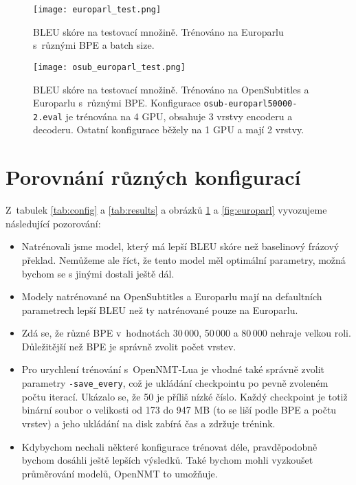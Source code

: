 \documentclass[a4]{article}
\begin{document}
\begin{figure}[p]
\centering
  \texttt{[image: europarl\_test.png]}
    \caption{BLEU skóre na testovací množině. Trénováno na Europarlu
	s~různými BPE a batch size.}
  \label{fig:europarl}
  \texttt{[image: osub\_europarl\_test.png]}
    \caption{BLEU skóre na testovací množině. Trénováno na OpenSubtitles a Europarlu
	s~různými BPE. Konfigurace \texttt{osub-europarl50000-2.eval} je trénována
	na 4 GPU, obsahuje 3 vrstvy encoderu a decoderu. Ostatní konfigurace běžely
	na 1 GPU a mají 2 vrstvy.}
  \label{fig:osub}
\end{figure}



\section{Porovnání různých konfigurací}

Z~tabulek \ref{tab:config} a \ref{tab:results} a obrázků 
\ref{fig:osub} a \ref{fig:europarl} vyvozujeme následující pozorování:

\begin{itemize}

\item Natrénovali jsme model, který má lepší BLEU skóre než baselinový frázový
překlad. Nemůžeme ale říct, že tento model měl optimální parametry, možná
bychom se s jinými dostali ještě dál.

\item Modely natrénované na OpenSubtitles a Europarlu mají na defaultních
parametrech lepší BLEU než ty
natrénované pouze na Europarlu. 

\item Zdá se, že různé BPE v~hodnotách 30\,000, 50\,000 a 80\,000 nehraje
velkou roli. Důležitější než BPE je správně zvolit počet vrstev.

\item Pro urychlení trénování s~OpenNMT-Lua je vhodné také správně zvolit parametry
\texttt{-save\_every}, což je ukládání checkpointu po pevně zvoleném počtu
iterací. Ukázalo se, že 50 je příliš nízké číslo. Každý checkpoint je totiž
binární soubor o velikosti od 173 do 947 MB (to se liší podle BPE a počtu
vrstev) a jeho ukládání na disk zabírá čas a zdržuje trénink.

\item Kdybychom nechali některé konfigurace trénovat déle, pravděpodobně
bychom dosáhli ještě lepších výsledků. Také bychom mohli vyzkoušet
průměrování modelů, OpenNMT to umožňuje. 
  


\end{itemize}
\end{document}
